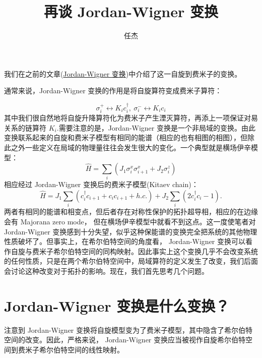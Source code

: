 \documentclass[10pt,UTF8]{ctexart}
\begin{document}
\title{再谈 Jordan-Wigner 变换}
\date{任杰}

\maketitle

\noindent 我们在之前的文章(\href{https://zhuanlan.zhihu.com/p/59368209}{Jordan-Wigner 变换})中介绍了这一自旋到费米子的变换。

\noindent 通常来说，Jordan-Wigner 变换的作用是将自旋算符变成费米子算符：

\begin{equation}
	\sigma_{i}^{+}\leftrightarrow K_{i}c_{i}^{\dagger},\ \sigma_{i}^{-}\leftrightarrow K_{i}c_{i}
\end{equation}
其中我们很自然地将自旋升降算符化为费米子产生湮灭算符，再添上一项保证对易关系的链算符 $K_{i}$.需要注意的是，Jordan-Wigner 变换是一个非局域的变换。由此变换联系起来的自旋和费米子模型有相同的能谱（相应的也有相图的相图），但除此之外一些定义在局域的物理量往往会发生很大的变化。一个典型就是横场伊辛模型：
\begin{equation}
	\hat{H}=\sum_{i}\left(J_{1}\sigma_{i}^{x}\sigma_{i+1}^{x}+J_{2}\sigma_{i}^{z}\right)
\end{equation}
相应经过 Jordan-Wigner 变换后的费米子模型(Kitaev chain)：
\begin{equation}
	\hat{H}=J_{1}\sum_{i}\left(c_{i}^{\dagger}c_{i+1}+c_{i}c_{i+1}+h.c.\right)+J_{2}\sum_{i}\left(2c_{i}^{\dagger}c_{i}-1\right).
\end{equation}
两者有相同的能谱和相变点，但后者存在对称性保护的拓扑超导相，相应的在边缘会有 Majorana zero mode， 但在横场伊辛模型中就看不到这点。这一度使笔者对 Jordan-Wigner 变换感到十分失望，似乎这种保能谱的变换完全把系统的其他物理性质破坏了。但事实上，在希尔伯特空间的角度看， Jordan-Wigner 变换可以看作自旋与费米子希尔伯特空间的同构映射。因此事实上这个变换几乎不会改变系统的任何性质，只是在两个希尔伯特空间中，局域算符的定义发生了改变，我们后面会讨论这种改变对于拓扑的影响。现在，我们首先思考几个问题。

\section*{ Jordan-Wigner  变换是什么变换？}
\noindent 注意到 Jordan-Wigner 变换将自旋模型变为了费米子模型，其中隐含了希尔伯特空间的改变。因此，严格来说， Jordan-Wigner 变换应当被视作自旋希尔伯特空间到费米子希尔伯特空间的线性映射。
\end{document}
